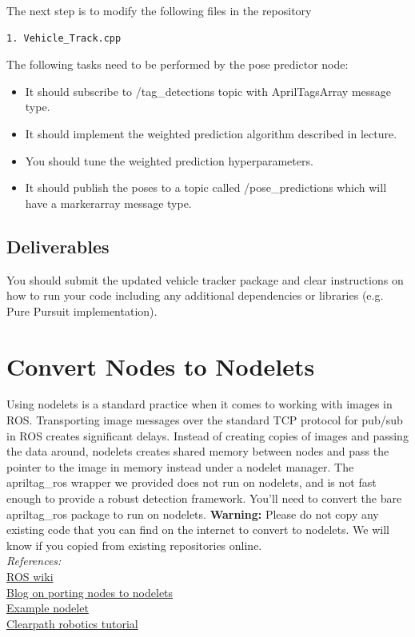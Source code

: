 \documentclass[letta4 paper]{article}
\numberwithin{equation}{section}
\newcommand{\0}{\mathbf{0}}
\begin{document}
	The next step is to modify the following files in the repository
	
	\begin{lstlisting}[language=bash]
	1. Vehicle_Track.cpp
	\end{lstlisting}
	The following tasks need to be performed by the pose predictor node: 
	\begin{itemize}
		\item It should subscribe to /tag\_detections topic with AprilTagsArray message type.
		\item It should implement the weighted prediction algorithm described in lecture. 
		\item You should tune the weighted prediction hyperparameters.
		\item It should publish the poses to a topic called /pose\_predictions which will have a markerarray message type. 
	\end{itemize}{}
	
	\subsection{Deliverables}
	You should submit the updated vehicle tracker package and clear instructions on how to run your code including any additional dependencies or libraries (e.g. Pure Pursuit implementation).
	
	\clearpage
	\section{Convert Nodes to Nodelets}
	Using nodelets is a standard practice when it comes to working with images in ROS. Transporting image messages over the standard TCP protocol for pub/sub in ROS creates significant delays. Instead of creating copies of images and passing the data around, nodelets creates shared memory between nodes and pass the pointer to the image in memory instead under a nodelet manager.
	The apriltag\_ros wrapper we provided does not run on nodelets, and is not fast enough to provide a robust detection framework. You'll need to convert the bare apriltag\_ros package to run on nodelets.
	\textbf{Warning:} Please do not copy any existing code that you can find on the internet to convert to nodelets. We will know if you copied from existing repositories online.\\

	
	\noindent\textit{References: }\\
	\href{http://wiki.ros.org/nodelet}{ROS wiki}\\
	\href{http://tayyabnaseer.blogspot.com/2013/04/porting-nodes-to-nodelets-in-ros.html}{Blog on porting nodes to nodelets}\\
	\href{https://github.com/cryborg21/sample_nodelet/tree/master/src}{Example nodelet}\\
	\href{https://www.clearpathrobotics.com/assets/guides/ros/Nodelet\%20Everything.html}{Clearpath robotics tutorial}\\
	
\end{document}
